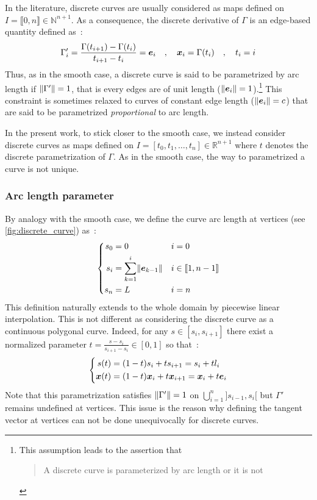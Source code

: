 In the literature, discrete curves are usually considered as maps defined on $I = \llbracket 0,n \rrbracket \in \mathbb{N}^{n+1}$. As a consequence, the discrete derivative of $\Gamma$ is an edge-based quantity defined as~: 
\begin{equation}
	\Gamma'_i = \frac{ \Gamma(t_{i+1}) -  \Gamma(t_i)}{t_{i+1} - t_i} = \boldsymbol{e}_i 
	\quad , \quad
	\boldsymbol{x}_{i} = \Gamma(t_i)
	\quad , \quad
	t_i = i
\end{equation}
Thus, as in the smooth case, a discrete curve is said to be parametrized by arc length if $\lVert\Gamma'\rVert = 1$, that is every edges are of unit length ($\lVert\boldsymbol{e}_i\rVert = 1$).\footnote{This assumption leads to the assertion that \blockcquote[p.10]{Hoffmann2008}{A discrete curve is parameterized by arc length or it is not}.} This constraint is sometimes relaxed to curves of constant edge length ($\lVert\boldsymbol{e}_i\rVert = c$) that are said to be parametrized \emph{proportional} to arc length.

In the present work, to stick closer to the smooth case, we instead consider discrete curves as maps defined on $I = [t_0, t_1, \ldots, t_n] \in \mathbb{R}^{n+1}$ where $t$ denotes the discrete parametrization of $\Gamma$. As in the smooth case, the way to parametrized a curve is not unique.

\subsubsection{Arc length parameter}
By analogy with the smooth case, we define the curve arc length at vertices (see \cref{fig:discrete_curve}) as~:
\begin{equation}
	\left\{
	\begin{aligned}
		s_0 	&= 0 								& 	&i = 0		\\
		s_i 	&= \sum_{k=1}^i \lVert\boldsymbol{e}_{k-1}\rVert		&	&i \in \llbracket 1, n-1 \rrbracket	\\
		s_n 	&=  L 								&	&i = n		\\
	\end{aligned}
	\right.
\end{equation}
This definition naturally extends to the whole domain by piecewise linear interpolation. This is not different as considering the discrete curve as a continuous polygonal curve. Indeed, for any $s \in [s_i, s_{i+1}]$ there exist a normalized parameter $t = \frac{s - s_i}{s_{i+1} - s_i} \in [0,1]$ so that~:
\begin{equation}
	\left\{
	\begin{aligned}
		s(t) &= (1-t) s_i + t s_{i+1} = s_i + t l_i \\
		\boldsymbol{x}(t) &= (1-t) \boldsymbol{x}_i  + t \boldsymbol{x}_{i+1} =  \boldsymbol{x}_i + t  \boldsymbol{e}_i 
	\end{aligned}
	\right.
\end{equation}
Note that this parametrization satisfies $\lVert\Gamma'\rVert=1$ on $\bigcup_{i=1}^n ]s_{i-1}, s_i[$ but $\Gamma'$ remains undefined at vertices. This issue is the reason why defining the tangent vector at vertices can not be done unequivocally for discrete curves.


